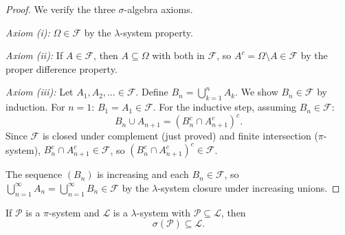 \documentclass[11pt,a4paper]{article}
\begin{document}
\begin{proof}
We verify the three $\sigma$-algebra axioms.

\textit{Axiom (i):} $\Omega \in \mathcal{F}$ by the $\lambda$-system
property.

\textit{Axiom (ii):} If $A \in \mathcal{F}$, then $A \subseteq \Omega$
with both in $\mathcal{F}$, so $A^c = \Omega \setminus A \in \mathcal{F}$
by the proper difference property.

\textit{Axiom (iii):} Let $A_1, A_2, \ldots \in \mathcal{F}$. Define
$B_n = \bigcup_{k=1}^n A_k$. We show $B_n \in \mathcal{F}$ by
induction. For $n = 1$: $B_1 = A_1 \in \mathcal{F}$. For the
inductive step, assuming $B_n \in \mathcal{F}$:
\begin{equation}
  B_n \cup A_{n+1} = (B_n^c \cap A_{n+1}^c)^c.
\end{equation}
Since $\mathcal{F}$ is closed under complement (just proved) and
finite intersection ($\pi$-system), $B_n^c \cap A_{n+1}^c \in \mathcal{F}$,
so $(B_n^c \cap A_{n+1}^c)^c \in \mathcal{F}$.

The sequence $(B_n)$ is increasing and each $B_n \in \mathcal{F}$, so
$\bigcup_{n=1}^\infty A_n = \bigcup_{n=1}^\infty B_n \in \mathcal{F}$
by the $\lambda$-system closure under increasing unions.
\end{proof}

\begin{keyresult}[title={Dynkin's $\pi$-$\lambda$ Theorem}]
\begin{theorem}
\label{thm:pi_lambda}
If $\mathcal{P}$ is a $\pi$-system and $\mathcal{L}$ is a
$\lambda$-system with $\mathcal{P} \subseteq \mathcal{L}$, then
\begin{equation}
  \sigma(\mathcal{P}) \subseteq \mathcal{L}.
\end{equation}
\end{theorem}
\end{keyresult}
\end{document}
